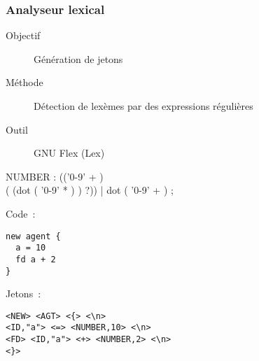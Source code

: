 \begin{frame}
	\frametitle{Analyseur lexical}
	\begin{description}
		\item [Objectif] Génération de jetons
		\item [Méthode] Détection de lexèmes par des expressions régulières
		\item [Outil] GNU Flex (Lex)
	\end{description}
\end{frame}

\begin{frame}[fragile]
	\begin{rail}
		NUMBER : (('0-9' + ) \\ ( (dot ( '0-9' * ) ) ?))
		| dot ( '0-9' + ) ;
	\end{rail}
\end{frame}

\begin{frame}[fragile]
	Code~:
	\begin{lstlisting}[language=Stibbons]
new agent {
  a = 10
  fd a + 2
}
	\end{lstlisting}
	Jetons~:
	\begin{lstlisting}[breaklines]
<NEW> <AGT> <{> <\n> 
<ID,"a"> <=> <NUMBER,10> <\n>
<FD> <ID,"a"> <+> <NUMBER,2> <\n>
<}>
	\end{lstlisting}
\end{frame}
